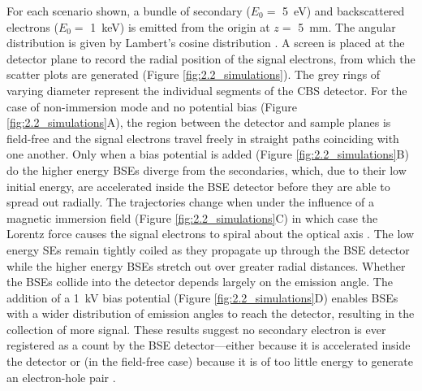 For each scenario shown, a bundle of secondary ($E_0 =$ \SI{5}{\electronvolt}) and backscattered electrons ($E_0 =$ \SI{1}{\kilo\electronvolt}) is emitted from the origin at $z =$ \SI{5}{\milli\meter}. The angular distribution is given by Lambert's cosine distribution \cite{reimer1998emission}. A screen is placed at the detector plane to record the radial position of the signal electrons, from which the scatter plots are generated (Figure \ref{fig:2.2_simulations}). The grey rings of varying diameter represent the individual segments of the CBS detector. For the case of non-immersion mode and no potential bias (Figure \ref{fig:2.2_simulations}A), the region between the detector and sample planes is field-free and the signal electrons travel freely in straight paths coinciding with one another. Only when a bias potential is added (Figure \ref{fig:2.2_simulations}B) do the higher energy BSEs diverge from the secondaries, which, due to their low initial energy, are accelerated inside the BSE detector before they are able to spread out radially. The trajectories change when under the influence of a magnetic immersion field (Figure \ref{fig:2.2_simulations}C) in which case the Lorentz force causes the signal electrons to spiral about the optical axis \cite{mullerova2009collection}. The low energy SEs remain tightly coiled as they propagate up through the BSE detector while the higher energy BSEs stretch out over greater radial distances. Whether the BSEs collide into the detector depends largely on the emission angle. The addition of a \SI{1}{\kilo\volt} bias potential (Figure \ref{fig:2.2_simulations}D) enables BSEs with a wider distribution of emission angles to reach the detector, resulting in the collection of more signal. These results suggest no secondary electron is ever registered as a count by the BSE detector---either because it is accelerated inside the detector or (in the field-free case) because it is of too little energy to generate an electron-hole pair \cite{vsakic2011boron}.

